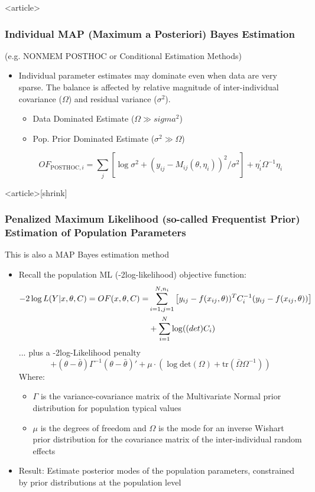 \documentclass[handout]{beamer}
\begin{document}
\begin{frame}<article>
  \frametitle{Individual MAP (Maximum a Posteriori) Bayes Estimation}
  
(e.g. NONMEM POSTHOC or Conditional Estimation Methods)

\begin{itemize}
\item Individual parameter estimates may dominate even when data are very sparse. The balance is affected by relative magnitude of inter-individual covariance ($\Omega$) and residual variance ($\sigma^2$). 
\begin{itemize}
\item Data Dominated Estimate ($\Omega \gg sigma^2$)
\item Pop. Prior Dominated Estimate ($\sigma^2 \gg \Omega$)
\end{itemize}
$$ OF_{\text{POSTHOC},i} = \sum_j\left[\log \sigma^2 + (y_{ij} - M_{ij}(\theta,\eta_i))^2/\sigma^2\right] + \eta_i^\prime\Omega^{-1}\eta_i$$
\end{itemize}

\end{frame}

\begin{frame}<article>[shrink]
  \frametitle{Penalized Maximum Likelihood (so-called Frequentist
    Prior) Estimation of Population Parameters}
  
This is also a MAP Bayes estimation method

\begin{itemize}
\item Recall the population ML (-2log-likelihood) objective function:
  \begin{align*}
     -2\log L(Y|x,\theta,C) = OF(x,\theta,C) = &
     \sum_{i=1,j=1}^{N,n_i}\left[y_{ij}-f(x_{ij},\theta))^TC_i^{-1}(y_{ij}-f(x_{ij},\theta))\right] \\
     &+ \sum_{i=1}^N\log(\text(det)C_i)
  \end{align*}
... plus a -2log-Likelihood penalty
$$ + (\theta - \bar{\theta})\Gamma^{-1}(\theta - \bar{\theta})' + \mu \cdot (\log\text{det}(\Omega)+\text{tr}(\bar{\Omega}\Omega^{-1}))$$
Where:
\begin{itemize}
\item $\Gamma$ is the variance-covariance matrix of the Multivariate Normal prior distribution for population typical values
\item $\mu$ is the degrees of freedom and $\Omega$ is the mode for an inverse Wishart prior distribution for the covariance matrix of the inter-individual random effects
\end{itemize}
\item Result: Estimate posterior modes of the population parameters, constrained by prior distributions at the population level
\end{itemize}

\end{frame}
\end{document}
